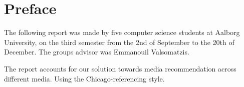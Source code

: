 \chapter*{Preface}
The following report was made by five computer science students at Aalborg University, on the third semester from the 2nd of September to the 20th of December. The groups advisor was Emmanouil Valsomatzis.


The report accounts for our solution towards media recommendation across different media. Using the Chicago-referencing style.

\null
\vfill
{}